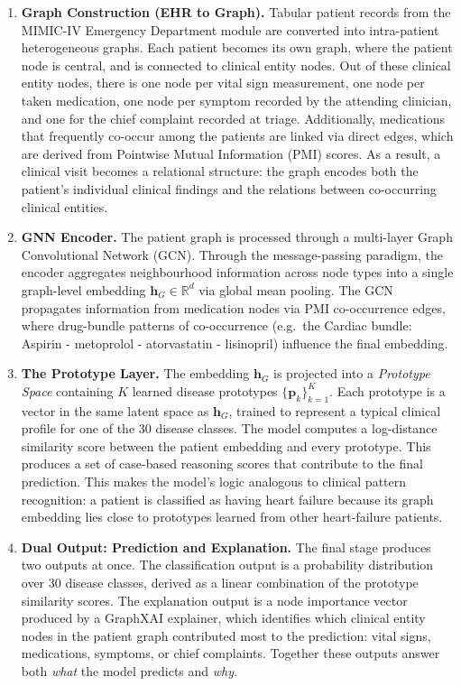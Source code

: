 \begin{enumerate}
  \item \textbf{Graph Construction (EHR to Graph).} Tabular patient records from the MIMIC-IV Emergency Department module are converted into intra-patient heterogeneous graphs. Each patient becomes its own graph, where the patient node is central, and is connected to clinical entity nodes. Out of these clinical entity nodes, there is one node per vital sign measurement, one node per taken medication, one node per symptom recorded by the attending clinician, and one for the chief complaint recorded at triage. Additionally, medications that frequently co-occur among the patients are linked via direct edges, which are derived from Pointwise Mutual Information (PMI) scores. As a result, a clinical visit becomes a relational structure: the graph encodes both the patient's individual clinical findings and the relations between co-occurring clinical entities.

  \item \textbf{GNN Encoder.}
        The patient graph is processed through a multi-layer Graph Convolutional Network (GCN). Through the message-passing paradigm, the encoder aggregates neighbourhood information across node types into a single graph-level embedding $\mathbf{h}_G \in \mathbb{R}^{d}$ via global mean pooling. The GCN propagates information from medication nodes via PMI co-occurrence edges, where drug-bundle patterns of co-occurrence (e.g.\
        the Cardiac bundle: Aspirin - metoprolol - atorvastatin - lisinopril) influence the final embedding.

  \item \textbf{The Prototype Layer.}
        The embedding $\mathbf{h}_G$ is projected into a \textit{Prototype Space} containing $K$ learned disease prototypes $\{\mathbf{p}_k\}_{k=1}^{K}$. Each prototype is a vector in the same latent space as $\mathbf{h}_G$,
        trained to represent a typical clinical profile for one of the 30 disease classes. The model computes a log-distance similarity score between the patient embedding and every prototype. This produces a set of case-based reasoning scores that
        contribute to the final prediction. This makes the model's logic analogous to clinical pattern recognition: a patient is classified as having heart failure because its graph embedding lies close to prototypes learned from other heart-failure patients.

  \item \textbf{Dual Output: Prediction and Explanation.}
        The final stage produces two outputs at once. The classification output is a probability distribution over 30 disease classes, derived as a linear combination of the prototype similarity scores. The explanation output is a node importance vector produced by a GraphXAI explainer, which identifies which clinical entity nodes in the patient
        graph contributed most to the prediction: vital signs, medications, symptoms, or chief complaints. Together these outputs answer both \textit{what} the model predicts and \textit{why}.
\end{enumerate}


